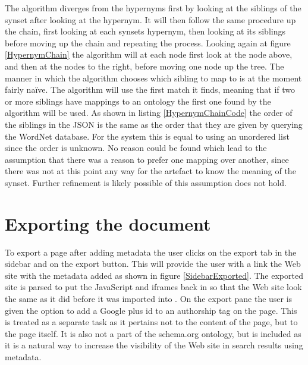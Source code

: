 The algorithm diverges from the hypernyms first by looking at the siblings of the synset after looking at the hypernym.
It will then follow the same procedure up the chain, first looking at each synsets hypernym,
then looking at its siblings before moving up the chain and repeating the process.
Looking again at figure \ref{HypernymChain} the algorithm will at each node first look at the node above,
and then at the nodes to the right, before moving one node up the tree.
The manner in which the algorithm chooses which sibling to map to is at the moment fairly naïve.
The algorithm will use the first match it finds,
meaning that if two or more siblings have mappings to an ontology the first one found by the algorithm will be used.
As shown in listing \ref{HypernymChainCode} the order of the siblings in the JSON is the same as the order that they
are given by querying the WordNet database.
For the system this is equal to using an unordered list since the order is unknown.
No reason could be found which lead to the assumption that there was a reason to prefer one mapping over another,
since there was not at this point any way for the artefact to know the meaning of the synset.
Further refinement is likely possible of this assumption does not hold.

\section{Exporting the document}
To export a page after adding metadata the user clicks on the export tab in the sidebar and on the export button.
This will provide the user with a link the Web site with the metadata added as shown in figure \ref{SidebarExported}.
The exported site is parsed to put the JavaScript and iframes back in so that the Web site look the same as it did
before it was imported into \theartefact.
On the export pane the user is given the option to add a Google plus id to an authorship tag on the page.
This is treated as a separate task as it pertains not to the content of the page, but to the page itself.
It is also not a part of the schema.org ontology, but is included as it is a natural way to increase the visibility of
the Web site in search results using metadata.

